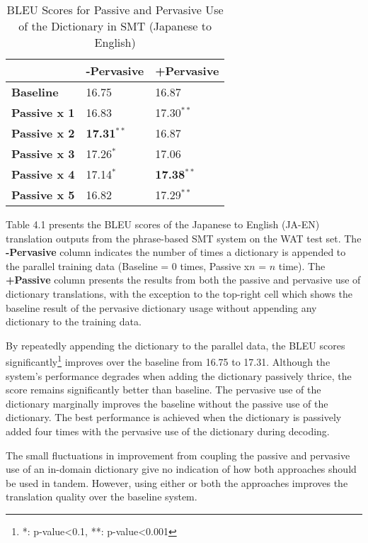 \begin{table}[H]
\centering
    \begin{tabular}{l|ll}
    ~           & \textbf{-Pervasive} &\textbf{ +Pervasive }\\ \hline
    \textbf{Baseline}    & 16.75      & 16.87      \\ \hline
    \textbf{Passive x 1 }& 16.83      &  17.30$^{**}$   \\
    \textbf{Passive x 2} & \textbf{17.31$^{**}$}    & 16.87      \\
    \textbf{Passive x 3 }&  17.26$^{*}$    & 17.06      \\
    \textbf{Passive x 4 }& 17.14$^{*}$     &  \textbf{17.38$^{**}$}   \\
    \textbf{Passive x 5 }& 16.82      &  17.29$^{**}$   \\
    \end{tabular}
\caption{BLEU Scores for Passive and Pervasive Use of the Dictionary in SMT (Japanese to English)}
\label{table:hytrajaen}
\end{table}

Table 4.1 presents the BLEU scores of the Japanese to English (JA-EN) translation outputs from the phrase-based SMT system on the WAT test set. The \textbf{-Pervasive} column indicates the number of times a dictionary is appended to the parallel training data (Baseline = 0 times, Passive x$n$ = $n$ time). The \textbf{+Passive} column presents the results from both the passive and pervasive use of dictionary translations, with the exception to the top-right cell which shows the baseline result of the pervasive dictionary usage without appending any dictionary to the training data.

By repeatedly appending the dictionary to the parallel data, the BLEU scores significantly\footnote{*: p-value<0.1, **: p-value<0.001} improves over the baseline from 16.75 to 17.31. Although the system’s performance degrades when adding the dictionary passively thrice, the score remains significantly better than baseline. The pervasive use of the dictionary marginally improves the baseline without the passive use of the dictionary. The best performance is achieved when the dictionary is passively added four times with the pervasive use of the dictionary during decoding.

The small fluctuations in improvement from coupling the passive and pervasive use of an in-domain dictionary give no indication of how both approaches should be used in tandem. However, using either or both the approaches improves the translation quality over the baseline system.

